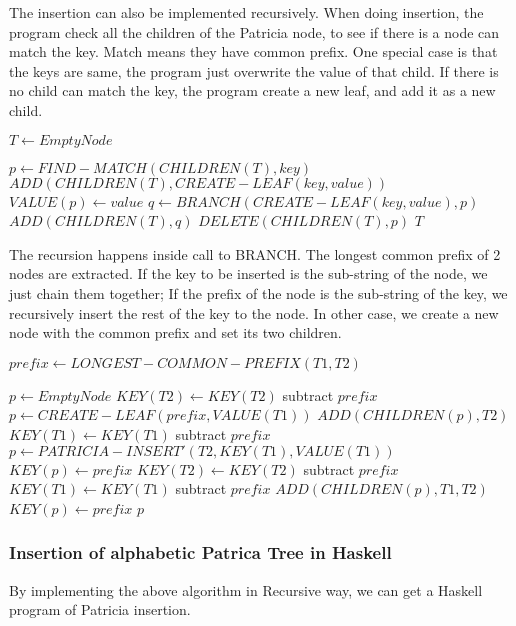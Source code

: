 \documentclass{article}
\begin{document}
The insertion can also be implemented recursively. When doing
insertion, the program check all the children of the Patricia node, to
see if there is a node can match the key. Match means they have common
prefix. One special case is that the keys are same, the program just
overwrite the value of that child. If there is no child can match the
key, the program create a new leaf, and add it as a new child.

\begin{algorithmic}[1]
   \State $T \leftarrow EmptyNode$ \EndIf

\State $p \leftarrow FIND-MATCH(CHILDREN(T), key)$
  \State $ADD(CHILDREN(T), CREATE-LEAF(key, value))$
  \State $VALUE(p) \leftarrow value$
\Else
  \State $q \leftarrow BRANCH(CREATE-LEAF(key, value), p)$
  \State $ADD(CHILDREN(T), q)$
  \State $DELETE(CHILDREN(T), p)$
\EndIf
\State \Return $T$
\EndFunction
\end{algorithmic}

The recursion happens inside call to BRANCH. The longest common prefix
of 2 nodes are extracted. If the key to be inserted is the sub-string of
the node, we just chain them together; If the prefix of the node is
the sub-string of the key, we recursively insert the rest of the key
to the node. In other case, we create a new node with the common
prefix and set its two children.

\begin{algorithmic}[1]
  \State $prefix \leftarrow LONGEST-COMMON-PREFIX(T1, T2)$

  \State $p \leftarrow EmptyNode$
    \State $KEY(T2) \leftarrow KEY(T2)$ subtract $prefix$
    \State $p \leftarrow CREATE-LEAF(prefix, VALUE(T1))$
    \State $ADD(CHILDREN(p), T2)$
    \State $KEY(T1) \leftarrow KEY(T1)$ subtract $prefix$
    \State $p \leftarrow PATRICIA-INSERT'(T2, KEY(T1), VALUE(T1))$
    \State $KEY(p) \leftarrow prefix$
  \Else
    \State $KEY(T2) \leftarrow KEY(T2)$ subtract $prefix$
    \State $KEY(T1) \leftarrow KEY(T1)$ subtract $prefix$
    \State $ADD(CHILDREN(p), T1, T2)$
    \State $KEY(p) \leftarrow prefix$
  \EndIf
  \State \Return $p$
\EndFunction
\end{algorithmic}

\subsubsection*{Insertion of alphabetic Patrica Tree in Haskell}
By implementing the above algorithm in Recursive way, we can get a
Haskell program of Patricia insertion.
\end{document}
